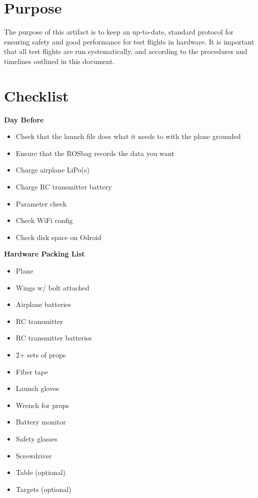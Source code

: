\documentclass[]{auvsi_doc}
\begin{document}
\begin{AUVSITitlePage}
\begin{artifacttable}
\end{artifacttable}
\end{AUVSITitlePage}

\section{Purpose}

The purpose of this artifact is to keep an up-to-date, standard protocol for ensuring safety and good performance for test flights in hardware. It is important that all test flights are run systematically, and according to the procedures and timelines outlined in this document.

\section{Checklist}

\textbf{Day Before}
\begin{itemize}
	\item Check that the launch file does what it needs to with the plane grounded
	\item Ensure that the ROSbag records the data you want
	\item Charge airplane LiPo(s)
	\item Charge RC transmitter battery
	\item Parameter check
	\item Check WiFi config
	\item Check disk space on Odroid
\end{itemize}

\hrulefill

\textbf{Hardware Packing List}
\begin{itemize}
	\item Plane
	\item Wings w/ bolt attached
	\item Airplane batteries
	\item RC transmitter
	\item RC transmitter batteries
	\item 2+ sets of props
	\item Fiber tape
	\item Launch gloves
	\item Wrench for props
	\item Battery monitor
	\item Safety glasses
	\item Screwdriver
	\item Table (optional)
	\item Targets (optional)
\end{itemize}
\end{document}
